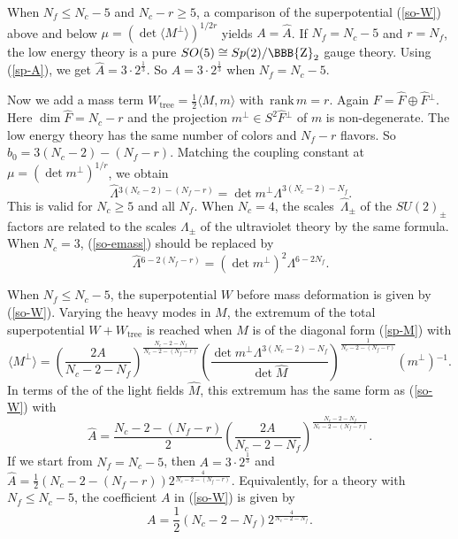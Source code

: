 \documentclass[lecture]{qft-l}
\newcommand{\Lam}{\varLambda}
\newcommand{\ZZ}{{\mbox{\BBB{Z}}}}
\newcommand{\bra}{\langle}
\newcommand{\ket}{\rangle}
\newcommand{\inv}[1]{\frac{1}{#1}}
\newcommand{\hf}{{\textstyle \inv{2}}}
\newcommand{\rank}{\mathrm{\,rank\,}}
\newcommand{\tree}{_\mathrm{tree}}
\newcommand{\hLam}{\,\hat{\!\Lam}{}}
\newcommand{\hF}{\hat{F}{}}
\newcommand{\hM}{\hat{M}{}}
\newcommand{\Mperp}{\bra M^\perp\ket}
\begin{document}
When $N_f\le N_c-5$ and $N_c-r\ge5$, a comparison of the superpotential
(\ref{so-W}) above and below $\mu=(\det\Mperp)^{1/2r}$ yields $A=\hat{A}$.
If $N_f=N_c-5$ and $r=N_f$, the low energy theory is a pure 
$SO(5)\cong Sp(2)/\ZZ_2$ gauge theory.
Using (\ref{sp-A}), we get $\hat{A}=3\cdot2^{\inv{3}}$.
So $A=3\cdot2^{\inv{3}}$ when $N_f=N_c-5$.

Now we add a mass term $W\tree=\hf\bra M,m\ket$ with $\rank m=r$.
Again $F=\hF\oplus\hF^\perp$.
Here $\dim\hF=N_c-r$ and the projection $m^\perp\in S^2\hF^\perp$ of $m$
is non-degenerate.
The low energy theory has the same number of colors and $N_f-r$ flavors.
So $b_0=3(N_c-2)-(N_f-r)$.
Matching the coupling constant at $\mu=(\det m^\perp)^{1/r}$, we obtain
        \begin{equation}\label{so-emass}
\hLam^{3(N_c-2)-(N_f-r)}=\det m^\perp\Lam^{3(N_c-2)-N_f}.
        \end{equation}
This is valid for $N_c\ge5$ and all $N_f$.
When $N_c=4$, the scales $\hLam_\pm$ of the $SU(2)_\pm$ factors are related
to the scales $\Lam_\pm$ of the ultraviolet theory by the same formula.
When $N_c=3$, (\ref{so-emass}) should be replaced by
	\begin{equation}\label{so3-emass}
\hLam^{6-2(N_f-r)}=(\det m^\perp)^2\Lam^{6-2N_f}.
        \end{equation}

When $N_f\le N_c-5$, the superpotential $W$ before mass deformation is 
given by (\ref{so-W}).
Varying the heavy modes in $M$, the extremum of the total superpotential
$W+W\tree$ is reached when $M$ is of the diagonal form (\ref{sp-M}) with
	\begin{equation}\label{so-perp}
\Mperp=\left(\frac{2A}{N_c-2-N_f}\right)^{\frac{N_c-2-N_f}{N_c-2-(N_f-r)}}
\left(\frac{\det m^\perp\Lam^{3(N_c-2)-N_f}}{\det\hM}\right)
^{\inv{N_c-2-(N_f-r)}}(m^\perp){}^{-1}.
	\end{equation}
In terms of the of the light fields $\hM$, this extremum has the same form 
as (\ref{so-W}) with
        \begin{equation}
\hat{A}=\frac{N_c-2-(N_f-r)}{2}
\left(\frac{2A}{N_c-2-N_f}\right)^{\frac{N_c-2-N_f}{N_c-2-(N_f-r)}}.
        \end{equation}
If we start from $N_f=N_c-5$, then $A=3\cdot 2^{\inv{3}}$ 
and $\hat{A}=\hf(N_c-2-(N_f-r))2^{\frac{4}{N_c-2-(N_f-r)}}$.
Equivalently, for a theory with $N_f\le N_c-5$, the coefficient
$A$ in (\ref{so-W}) is given by
	\begin{equation}\label{so-A}
A=\hf(N_c-2-N_f)2^{\frac{4}{N_c-2-N_f}}.
	\end{equation}
\end{document}
